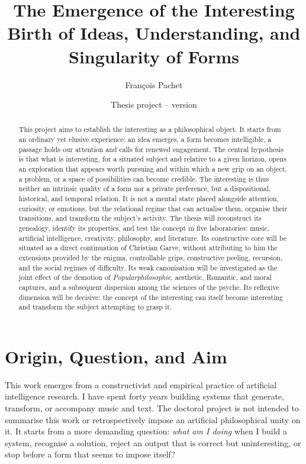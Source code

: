 \documentclass[11pt,a4paper]{article}
\title{The Emergence of the Interesting\\
\large Birth of Ideas, Understanding, and Singularity of Forms}
\author{François Pachet}
\date{Thesis project -- version \projectversion\\\small \projectdate}
\begin{document}
\maketitle

\begin{abstract}
This project aims to establish the interesting as a philosophical object. It
starts from an ordinary yet elusive experience: an idea emerges, a form becomes
intelligible, a passage holds our attention and calls for renewed engagement.
The central hypothesis is that what is interesting, for a situated subject and
relative to a given horizon, opens an exploration that appears worth pursuing
and within which a new grip on an object, a problem, or a space of possibilities
can become credible. The interesting
is thus neither an intrinsic quality of a form nor a private preference, but a
dispositional, historical, and temporal relation. It is not a mental state
placed alongside attention, curiosity, or emotions, but the relational regime
that can actualise them, organise their transitions, and transform the subject's
activity. The thesis will reconstruct
its genealogy, identify its properties, and test the concept in five
laboratories: music, artificial intelligence, creativity, philosophy, and
literature. Its constructive core will be situated as a direct continuation of
Christian Garve, without attributing to him the extensions provided by the
enigma, controllable grips, constructive peeling, recursion, and the social
regimes of difficulty. Its weak canonisation will be investigated as the joint
effect of the demotion of \emph{Popularphilosophie}, aesthetic, Romantic, and
moral captures, and a subsequent dispersion among the sciences of the psyche.
Its reflexive dimension will be decisive: the concept of the interesting can
itself become interesting and transform the subject attempting to grasp it.
\end{abstract}

\section{Origin, Question, and Aim}

This work emerges from a constructivist and empirical practice of artificial
intelligence research. I have spent forty years building systems that generate,
transform, or accompany music and text. The doctoral project is not intended to
summarise this work or retrospectively impose an artificial philosophical unity
on it. It starts from a more demanding question: \emph{what am I doing} when I
build a system, recognise a solution, reject an output that is correct but
uninteresting, or stop before a form that seems to impose itself?
\end{document}
